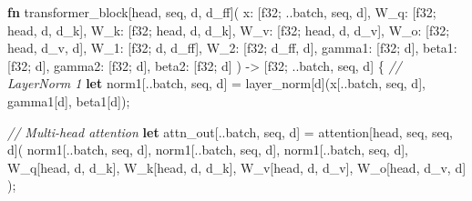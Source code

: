 \documentclass[11pt,titlepage]{article}
\newenvironment{Shaded}{}{}
\newcommand{\CommentTok}[1]{\textcolor[rgb]{0.38,0.63,0.69}{\textit{#1}}}
\newcommand{\DataTypeTok}[1]{\textcolor[rgb]{0.56,0.13,0.00}{#1}}
\newcommand{\KeywordTok}[1]{\textcolor[rgb]{0.00,0.44,0.13}{\textbf{#1}}}
\newcommand{\NormalTok}[1]{#1}
\newcommand{\OperatorTok}[1]{\textcolor[rgb]{0.40,0.40,0.40}{#1}}
\begin{document}
\begin{Shaded}
\begin{Highlighting}[]
\KeywordTok{fn}\NormalTok{ transformer_block[head, seq, d, d_ff](}
\NormalTok{    x: }\OperatorTok{[}\DataTypeTok{f32}\NormalTok{; ..batch, seq, d}\OperatorTok{]}\NormalTok{,}
\NormalTok{    W_q: }\OperatorTok{[}\DataTypeTok{f32}\NormalTok{; head, d, d_k}\OperatorTok{]}\NormalTok{,}
\NormalTok{    W_k: }\OperatorTok{[}\DataTypeTok{f32}\NormalTok{; head, d, d_k}\OperatorTok{]}\NormalTok{,}
\NormalTok{    W_v: }\OperatorTok{[}\DataTypeTok{f32}\NormalTok{; head, d, d_v}\OperatorTok{]}\NormalTok{,}
\NormalTok{    W_o: }\OperatorTok{[}\DataTypeTok{f32}\NormalTok{; head, d_v, d}\OperatorTok{]}\NormalTok{,}
\NormalTok{    W_1: }\OperatorTok{[}\DataTypeTok{f32}\NormalTok{; d, d_ff}\OperatorTok{]}\NormalTok{,}
\NormalTok{    W_2: }\OperatorTok{[}\DataTypeTok{f32}\NormalTok{; d_ff, d}\OperatorTok{]}\NormalTok{,}
\NormalTok{    gamma1: }\OperatorTok{[}\DataTypeTok{f32}\NormalTok{; d}\OperatorTok{]}\NormalTok{, beta1: }\OperatorTok{[}\DataTypeTok{f32}\NormalTok{; d}\OperatorTok{]}\NormalTok{,}
\NormalTok{    gamma2: }\OperatorTok{[}\DataTypeTok{f32}\NormalTok{; d}\OperatorTok{]}\NormalTok{, beta2: }\OperatorTok{[}\DataTypeTok{f32}\NormalTok{; d}\OperatorTok{]}
\NormalTok{) -> }\OperatorTok{[}\DataTypeTok{f32}\NormalTok{; ..batch, seq, d}\OperatorTok{]}
\OperatorTok{\{}
    \CommentTok{// LayerNorm 1}
    \KeywordTok{let}\NormalTok{ norm1}\OperatorTok{[}\NormalTok{..batch, seq, d}\OperatorTok{]}\NormalTok{ = layer_norm}\OperatorTok{[}\NormalTok{d}\OperatorTok{]}\NormalTok{(x}\OperatorTok{[}\NormalTok{..batch, seq, d}\OperatorTok{]}\NormalTok{, gamma1}\OperatorTok{[}\NormalTok{d}\OperatorTok{]}\NormalTok{, beta1}\OperatorTok{[}\NormalTok{d}\OperatorTok{]}\NormalTok{);}
    
    \CommentTok{// Multi-head attention}
    \KeywordTok{let}\NormalTok{ attn_out}\OperatorTok{[}\NormalTok{..batch, seq, d}\OperatorTok{]}\NormalTok{ = attention}\OperatorTok{[}\NormalTok{head, seq, seq, d}\OperatorTok{]}\NormalTok{(}
\NormalTok{        norm1}\OperatorTok{[}\NormalTok{..batch, seq, d}\OperatorTok{]}\NormalTok{, norm1}\OperatorTok{[}\NormalTok{..batch, seq, d}\OperatorTok{]}\NormalTok{, norm1}\OperatorTok{[}\NormalTok{..batch, seq, d}\OperatorTok{]}\NormalTok{,}
\NormalTok{        W_q}\OperatorTok{[}\NormalTok{head, d, d_k}\OperatorTok{]}\NormalTok{, W_k}\OperatorTok{[}\NormalTok{head, d, d_k}\OperatorTok{]}\NormalTok{, W_v}\OperatorTok{[}\NormalTok{head, d, d_v}\OperatorTok{]}\NormalTok{, W_o}\OperatorTok{[}\NormalTok{head, d_v, d}\OperatorTok{]}
\NormalTok{    );}
    

\end{Highlighting}
\end{Shaded}
\end{document}
